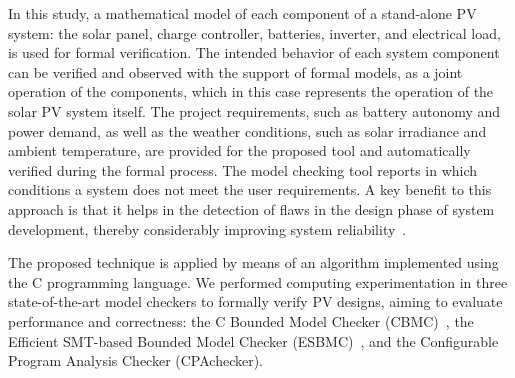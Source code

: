 In this study, a mathematical model of each component of a stand-alone PV system: the solar panel, charge controller, batteries, inverter, and electrical load, is used for formal verification. The intended behavior of each system component can be verified and observed with the support of formal models, as a joint operation of the components, which in this case represents the operation of the solar PV system itself. The project requirements, such as battery autonomy and power demand, as well as the weather conditions, such as solar irradiance and ambient temperature, are provided for the proposed tool and automatically verified during the formal process. The model checking tool reports in which conditions a system does not meet the user requirements. A key benefit to this approach is that it helps in the detection of flaws in the design phase of system development, thereby considerably improving system reliability~\cite{Akram2018}. 

The proposed technique is applied by means of an algorithm implemented using the C programming language. We performed computing experimentation in three state-of-the-art model checkers to formally verify PV designs, aiming to evaluate performance and correctness: the C Bounded Model Checker (CBMC)~\cite{Kroening}, the Efficient SMT-based Bounded Model Checker (ESBMC)~\cite{esbmc2018}, and the Configurable Program Analysis Checker (CPAchecker).

